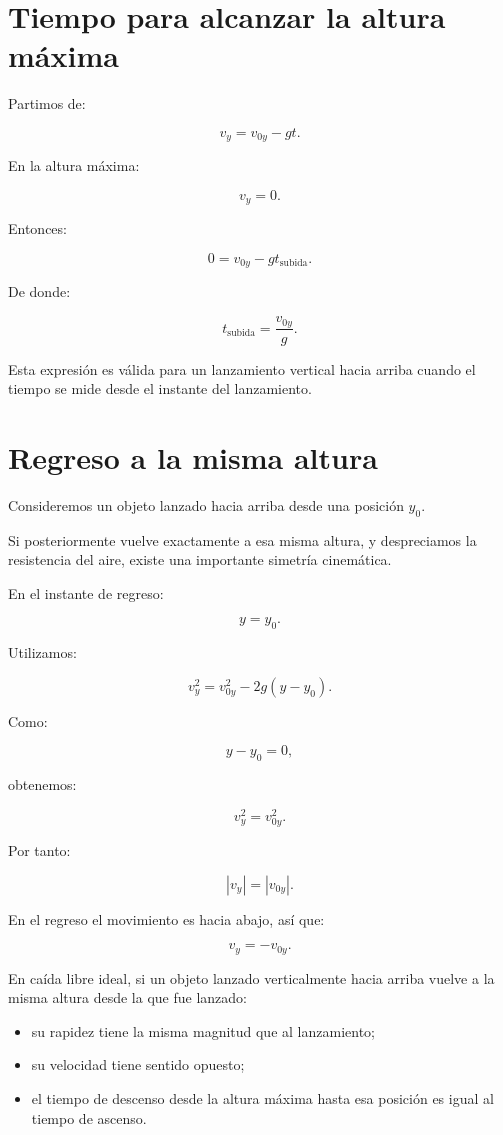 \section{Tiempo para alcanzar la altura máxima}

Partimos de:

\[ v_y=v_{0y}-gt. \]

En la altura máxima:

\[ v_y=0. \]

Entonces:

\[ 0=v_{0y}-gt_{\text{subida}}. \]

De donde:

\[ \boxed{t_{\text{subida}}=\frac{v_{0y}}{g}}. \]

Esta expresión es válida para un lanzamiento vertical hacia arriba cuando el tiempo se mide desde el instante del lanzamiento.


\section{Regreso a la misma altura}

Consideremos un objeto lanzado hacia arriba desde una posición \(y_0\).

Si posteriormente vuelve exactamente a esa misma altura, y despreciamos la resistencia del aire, existe una importante simetría cinemática.

En el instante de regreso:

\[ y=y_0. \]

Utilizamos:

\[ v_y^2=v_{0y}^2-2g(y-y_0). \]

Como:

\[ y-y_0=0, \]

obtenemos:

\[ v_y^2=v_{0y}^2. \]

Por tanto:

\[ |v_y|=|v_{0y}|. \]

En el regreso el movimiento es hacia abajo, así que:

\[ \boxed{v_y=-v_{0y}}. \]

\begin{principio}
En caída libre ideal, si un objeto lanzado verticalmente hacia arriba vuelve a la misma altura desde la que fue lanzado:

\begin{itemize}
    \item su rapidez tiene la misma magnitud que al lanzamiento;
    \item su velocidad tiene sentido opuesto;
    \item el tiempo de descenso desde la altura máxima hasta esa posición es igual al tiempo de ascenso.
\end{itemize}
\end{principio}


